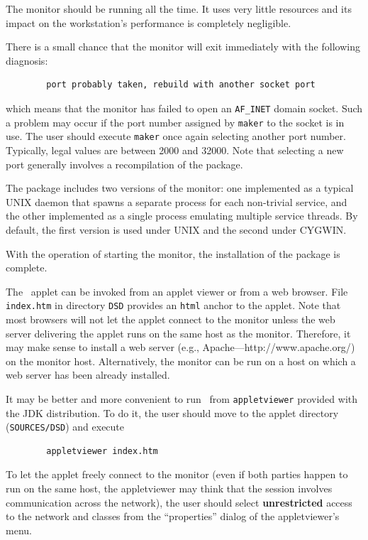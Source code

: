 The monitor should be running all the time.
It uses very little resources and its impact on the workstation's
performance is completely negligible.

There is a small
chance that the monitor will exit immediately with the following diagnosis:
\begin{verbatim}
        port probably taken, rebuild with another socket port
\end{verbatim}
which means that the monitor has failed to open an {\tt AF\_INET} domain socket.
Such a problem may occur if the port number assigned by {\tt maker} to
the socket is in use.
The user should execute {\tt maker} once again selecting another port number.
Typically, legal values are between 2000 and 32000.
Note that selecting a new port generally involves a recompilation of
the package.

The package includes two versions of the monitor: one implemented as a
typical UNIX daemon that spawns a separate process for each non-trivial
service, and the other implemented as a single process emulating multiple
service threads.
By default, the first version is used under UNIX and the second under
CYGWIN.

With the operation of starting the monitor, the installation of the package
is complete.

The \dsd\ applet can be invoked from an applet viewer or from a web browser.
File {\tt index.htm}
in directory {\tt DSD} provides an {\tt html} anchor to the applet.
Note that most browsers will not let the applet connect to the monitor
unless the web server delivering the applet runs on the same host as the
monitor.
Therefore, it may make sense to install a web server
(e.g.,
Apache---{http://www.apache.org/})
on the monitor host.
Alternatively, the monitor can be run on a host on which a web server has been
already installed.

It may be better and more convenient to run \dsd\ from {\tt appletviewer}
provided with the JDK distribution.
To do it, the user should move to the applet directory ({\tt SOURCES/DSD})
and execute
\begin{verbatim}
        appletviewer index.htm
\end{verbatim}

To let the applet freely connect to the monitor (even if both parties
happen to run
on the same host, the appletviewer may think that the session involves
communication across the network), the user should select {\bf unrestricted}
access to the network and classes from the ``properties'' dialog of the
appletviewer's menu.

